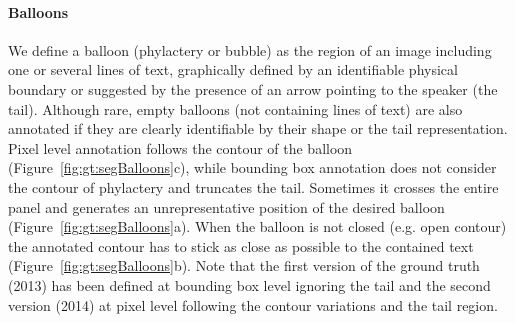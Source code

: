 

\paragraph{Balloons} %
\label{par:balloons}
We define a balloon (phylactery or bubble) as the region of an image including one or several lines of text, graphically defined by an identifiable physical boundary or suggested by the presence of an arrow pointing to the speaker (the tail).
Although rare, empty balloons (not containing lines of text) are also annotated if they are clearly identifiable by their shape or
the tail representation.
Pixel level annotation follows the contour of the balloon (Figure~\ref{fig:gt:segBalloons}c), while bounding box annotation does not consider the contour of phylactery and truncates the tail.
Sometimes it crosses the entire panel and generates an unrepresentative position of the desired balloon (Figure~\ref{fig:gt:segBalloons}a).
When the balloon is not closed (e.g. open contour) the annotated contour has to stick as close as possible to the contained text (Figure~\ref{fig:gt:segBalloons}b).
Note that the first version of the ground truth (2013) has been defined at bounding box level ignoring the tail and the second version (2014) at pixel level following the contour variations and the tail region.

